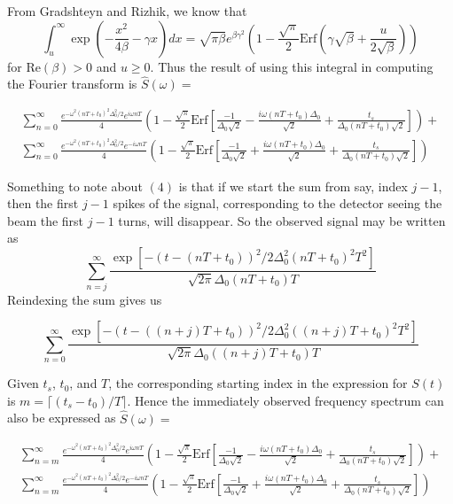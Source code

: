 From Gradshteyn and Rizhik, we know that 
\begin{equation}
\int^{\infty}_u\exp\left(-\frac{x^2}{4\beta}-\gamma x\right)dx=\sqrt{\pi\beta}e^{\beta\gamma^2}\left(1-\frac{\sqrt{\pi}}{2}\text{Erf}\left(\gamma\sqrt{\beta}+\frac{u}{2\sqrt{\beta}}\right)\right)
\end{equation}
for $\text{Re}(\beta)>0$ and $u\geq0$. Thus the result of using this integral in computing the Fourier transform is $\hat{S}(\omega)=$ 

\begin{gather}
\sum^{\infty}_{n=0}\frac{e^{-\omega^2(nT+t_0)^2\Delta^2_0/2}e^{i\omega nT}}{4}\left(1-\frac{\sqrt{\pi}}{2}\text{Erf}\left[\frac{-1}{\Delta_0\sqrt{2}}-\frac{i\omega (nT+t_0)\Delta_0}{\sqrt{2}}+\frac{t_s}{\Delta_0(nT+t_0)\sqrt{2}}\right]\right)+ \nonumber \\
\sum^{\infty}_{n=0}\frac{e^{-\omega^2(nT+t_0)^2\Delta^2_0/2}e^{-i\omega nT}}{4}\left(1-\frac{\sqrt{\pi}}{2}\text{Erf}\left[\frac{-1}{\Delta_0\sqrt{2}}+\frac{i\omega (nT+t_0)\Delta_0}{\sqrt{2}}+\frac{t_s}{\Delta_0(nT+t_0)\sqrt{2}}\right]\right)
\end{gather}

Something to note about $(4)$ is that if we start the sum from say, index $j-1$, then the first $j-1$ spikes of the signal, corresponding to the detector seeing the beam the first $j-1$ turns, will disappear. So the observed signal may be written as \[\sum^{\infty}_{n=j}\frac{\exp[-(t-(nT+t_0))^2/2\Delta^2_0(nT+t_0)^2T^2]}{\sqrt{2\pi}\Delta_0(nT+t_0)T}\] Reindexing the sum gives us 

\begin{equation}
\sum^{\infty}_{n=0}\frac{\exp[-(t-((n+j)T+t_0))^2/2\Delta^2_0((n+j)T+t_0)^2T^2]}{\sqrt{2\pi}\Delta_0((n+j)T+t_0)T}
\end{equation}

Given $t_s$, $t_0$, and $T$, the corresponding starting index in the expression for $S(t)$ is $m=\lceil{(t_s-t_0)/T}\rceil$. Hence the immediately observed frequency spectrum can also be expressed as $\hat{S}(\omega)=$ 

\begin{gather}
\sum^{\infty}_{n=m}\frac{e^{-\omega^2(nT+t_0)^2\Delta^2_0/2}e^{i\omega nT}}{4}\left(1-\frac{\sqrt{\pi}}{2}\text{Erf}\left[\frac{-1}{\Delta_0\sqrt{2}}-\frac{i\omega (nT+t_0)\Delta_0}{\sqrt{2}}+\frac{t_s}{\Delta_0(nT+t_0)\sqrt{2}}\right]\right)+ \nonumber \\
\sum^{\infty}_{n=m}\frac{e^{-\omega^2(nT+t_0)^2\Delta^2_0/2}e^{-i\omega nT}}{4}\left(1-\frac{\sqrt{\pi}}{2}\text{Erf}\left[\frac{-1}{\Delta_0\sqrt{2}}+\frac{i\omega (nT+t_0)\Delta_0}{\sqrt{2}}+\frac{t_s}{\Delta_0(nT+t_0)\sqrt{2}}\right]\right)
\end{gather}\label{eq:approxFreqDistribGaussianEnergy}

